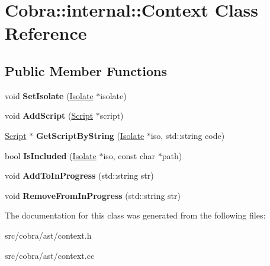 \hypertarget{class_cobra_1_1internal_1_1_context}{\section{Cobra\+:\+:internal\+:\+:Context Class Reference}
\label{class_cobra_1_1internal_1_1_context}
}
\subsection*{Public Member Functions}
\begin{DoxyCompactItemize}
\item 
\hypertarget{class_cobra_1_1internal_1_1_context_a9ce99f725452c20315f88c9fb0328baa}{void {\bfseries Set\+Isolate} (\hyperlink{class_cobra_1_1internal_1_1_isolate}{Isolate} $\ast$isolate)}\label{class_cobra_1_1internal_1_1_context_a9ce99f725452c20315f88c9fb0328baa}

\item 
\hypertarget{class_cobra_1_1internal_1_1_context_a077c432927bd36374978cf56c55b58e2}{void {\bfseries Add\+Script} (\hyperlink{class_cobra_1_1internal_1_1_script}{Script} $\ast$script)}\label{class_cobra_1_1internal_1_1_context_a077c432927bd36374978cf56c55b58e2}

\item 
\hypertarget{class_cobra_1_1internal_1_1_context_a9128b4d12daae36ec57607d9d7867f6c}{\hyperlink{class_cobra_1_1internal_1_1_script}{Script} $\ast$ {\bfseries Get\+Script\+By\+String} (\hyperlink{class_cobra_1_1internal_1_1_isolate}{Isolate} $\ast$iso, std\+::string code)}\label{class_cobra_1_1internal_1_1_context_a9128b4d12daae36ec57607d9d7867f6c}

\item 
\hypertarget{class_cobra_1_1internal_1_1_context_a2309f31e215ee3278600c9b057fc7317}{bool {\bfseries Is\+Included} (\hyperlink{class_cobra_1_1internal_1_1_isolate}{Isolate} $\ast$iso, const char $\ast$path)}\label{class_cobra_1_1internal_1_1_context_a2309f31e215ee3278600c9b057fc7317}

\item 
\hypertarget{class_cobra_1_1internal_1_1_context_a28c2f40e6d64392b412184212005645c}{void {\bfseries Add\+To\+In\+Progress} (std\+::string str)}\label{class_cobra_1_1internal_1_1_context_a28c2f40e6d64392b412184212005645c}

\item 
\hypertarget{class_cobra_1_1internal_1_1_context_afe6bf704c553475cbdc32d89e489a852}{void {\bfseries Remove\+From\+In\+Progress} (std\+::string str)}\label{class_cobra_1_1internal_1_1_context_afe6bf704c553475cbdc32d89e489a852}

\end{DoxyCompactItemize}


The documentation for this class was generated from the following files\+:\begin{DoxyCompactItemize}
\item 
src/cobra/ast/context.\+h\item 
src/cobra/ast/context.\+cc\end{DoxyCompactItemize}
